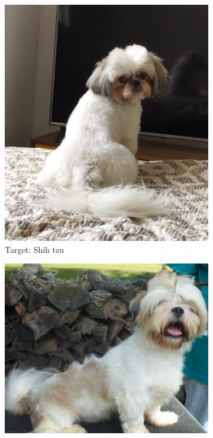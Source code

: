 \documentclass{article}
\begin{document}
    \begin{figure}[htbp]
        \centering
        \begin{subfigure}{.35\textwidth}
            \centering
            \includegraphics[width=\linewidth]{img/dog_shihtzu.jpeg}
            \caption{Target: Shih tzu}
            \label{fig:shih_tzu}
        \end{subfigure}%
        \hspace{0.1\textwidth}
        \begin{subfigure}{.45\textwidth}
            \centering
            \includegraphics[width=\linewidth]{img/Lhasa_apso_06652.jpg}

\end{subfigure}
\end{figure}
\end{document}
